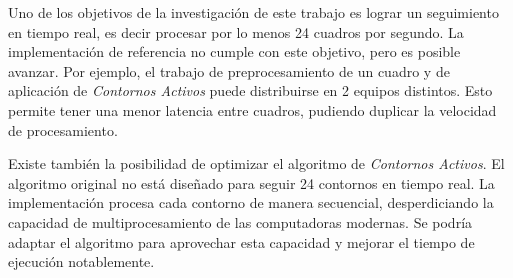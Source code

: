 Uno de los objetivos de la investigación de este trabajo es lograr un seguimiento
en tiempo real, es decir procesar por lo menos 24 cuadros por segundo. La
implementación de referencia no cumple con este objetivo, pero es posible
avanzar. Por ejemplo, el trabajo de preprocesamiento de un cuadro y de
aplicación de \textit{Contornos Activos} puede distribuirse en 2 equipos
distintos. Esto permite tener una menor latencia entre cuadros, pudiendo
duplicar la velocidad de procesamiento.

Existe también la posibilidad de optimizar el algoritmo de \textit{Contornos
Activos}. El algoritmo original no está diseñado para seguir 24 contornos en
tiempo real. La implementación procesa cada contorno de manera secuencial,
desperdiciando la capacidad de multiprocesamiento de las computadoras modernas.
Se podría adaptar el algoritmo para aprovechar esta capacidad y mejorar el
tiempo de ejecución notablemente.

